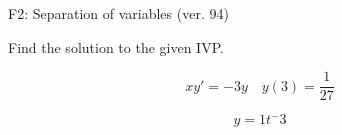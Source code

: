 \begin{exercise}
  \begin{exerciseTitle}F2: Separation of variables (ver. 94)\end{exerciseTitle}
  \begin{exerciseStatement}
    
Find the solution to the given IVP.

    
\[xy'= -3 y \hspace{1em} y( 3 ) = \frac{1}{27}\]

  \end{exerciseStatement}
  \begin{exerciseAnswer}
    
\[y= 1 t^ -3\]

  \end{exerciseAnswer}
\end{exercise}